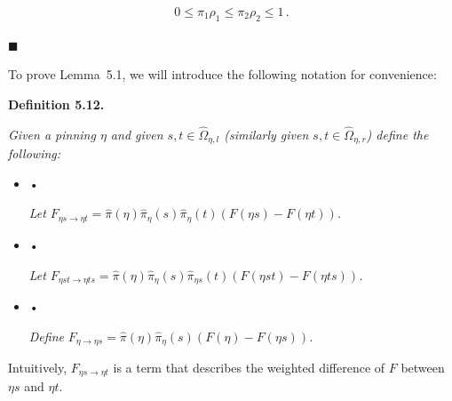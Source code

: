 \documentclass[10pt,a4paper]{article}
\begin{document}
\[\begin{gathered}
0\leq\pi_{1}\rho_{1}\leq\pi_{2}\rho_{2}\leq 1\,.
\end{gathered}\]




\ensuremath{\blacksquare}\par





To prove Lemma 5.1, we will introduce the following notation for convenience:\par





\par\medskip\noindent\textbf{\textbf{Definition 5.12}\textbf{.}}\par



\emph{Given a pinning $\eta$ and given $s,t\in\hat{\Omega}_{\eta,l}$ (similarly given $s,t\in\hat{\Omega}_{\eta,r}$) define the following:}\par




\begin{itemize}


\item[] • 


\emph{Let }$F_{\eta s\rightarrow\eta t}=\hat{\pi}(\eta)\hat{\pi}_{\eta}(s)\hat{\pi}_{\eta}(t)(F(\eta s)-F(\eta t))$\emph{.}\par




\item[] • 


\emph{Let }$F_{\eta st\rightarrow\eta ts}=\hat{\pi}(\eta)\hat{\pi}_{\eta}(s)\hat{\pi}_{\eta s}(t)(F(\eta st)-F(\eta ts))$\emph{.}\par




\item[] • 


\emph{Define }$F_{\eta\rightarrow\eta s}=\hat{\pi}(\eta)\hat{\pi}_{\eta}(s)(F(\eta)-F(\eta s))$\emph{.}\par




\end{itemize}






Intuitively, $F_{\eta s\rightarrow\eta t}$ is a term that describes the weighted difference of $F$ between $\eta s$ and $\eta t$.\par
\end{document}
